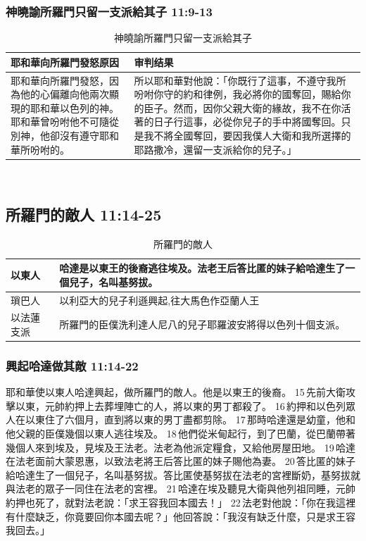 \subsubsection{神曉諭所羅門只留一支派給其子 11:9-13}
\begin{table}[H]
\centering 
\begin{tabular}{p{5.75cm}|p{11.25cm}}\hline\hline
耶和華向所羅門發怒原因&审判结果\\\hline
耶和華向所羅門發怒，因為他的心偏離向他兩次顯現的耶和華以色列的神。耶和華曾吩咐他不可隨從別神，他卻沒有遵守耶和華所吩咐的。&所以耶和華對他說：「你既行了這事，不遵守我所吩咐你守的約和律例，我必將你的國奪回，賜給你的臣子。然而，因你父親大衛的緣故，我不在你活著的日子行這事，必從你兒子的手中將國奪回。只是我不將全國奪回，要因我僕人大衛和我所選擇的耶路撒冷，還留一支派給你的兒子。」\\\hline
\end{tabular}
\caption{神曉諭所羅門只留一支派給其子}
\end{table}
  

\subsection{所羅門的敵人 11:14-25}
\begin{table}[!hbp]
\centering 
\begin{tabular}{p{2cm}|p{14cm}}\hline\hline
以東人&哈達是以東王的後裔逃往埃及。法老王后答比匿的妹子給哈達生了一個兒子，名叫基努拔。\\\hline
瑣巴人&以利亞大的兒子利遜興起,往大馬色作亞蘭人王 \\\hline
以法蓮支派&所羅門的臣僕洗利達人尼八的兒子耶羅波安將得以色列十個支派。 \\\hline
\end{tabular}
\caption{所羅門的敵人}
\end{table}

\subsubsection{興起哈達做其敵 11:14-22}
耶和華使以東人哈達興起，做所羅門的敵人。他是以東王的後裔。 15 先前大衛攻擊以東，元帥約押上去葬埋陣亡的人，將以東的男丁都殺了。 16 約押和以色列眾人在以東住了六個月，直到將以東的男丁盡都剪除。 17 那時哈達還是幼童，他和他父親的臣僕幾個以東人逃往埃及。 18 他們從米甸起行，到了巴蘭，從巴蘭帶著幾個人來到埃及，見埃及王法老。法老為他派定糧食，又給他房屋田地。 19 哈達在法老面前大蒙恩惠，以致法老將王后答比匿的妹子賜他為妻。 20 答比匿的妹子給哈達生了一個兒子，名叫基努拔。答比匿使基努拔在法老的宮裡斷奶，基努拔就與法老的眾子一同住在法老的宮裡。 21 哈達在埃及聽見大衛與他列祖同睡，元帥約押也死了，就對法老說：「求王容我回本國去！」 22 法老對他說：「你在我這裡有什麼缺乏，你竟要回你本國去呢？」他回答說：「我沒有缺乏什麼，只是求王容我回去。」

